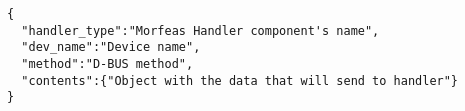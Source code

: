 \begin{lstlisting}[frame=single,caption=Structure of contents for POST request for Morfeas\_dbus\_proxy.php,label=lst:dbus_proxy]
{
  "handler_type":"Morfeas Handler component's name",
  "dev_name":"Device name",
  "method":"D-BUS method",
  "contents":{"Object with the data that will send to handler"}
}
\end{lstlisting}

